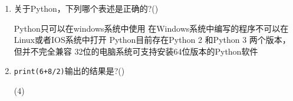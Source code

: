 \documentclass[11pt]{ctexart}
\begin{document}
\begin{enumerate}
        \newpage
        \item 关于Python，下列哪个表述是正确的?(\qquad)
        \begin{tasks}
            \task Python只可以在windows系统中使用
            \task 在Windows系统中编写的程序不可以在Linux或者IOS系统中打开
            \task Python目前存在Python 2 和Python 3 两个版本，但并不完全兼容
            \task 32位的电脑系统可支持安装64位版本的Python软件
        \end{tasks}

        \item \lstinline!print(6+8/2)!输出的结果是?(\qquad)
        \begin{tasks}(4)
        \end{tasks}
    \end{enumerate}
\end{document}
